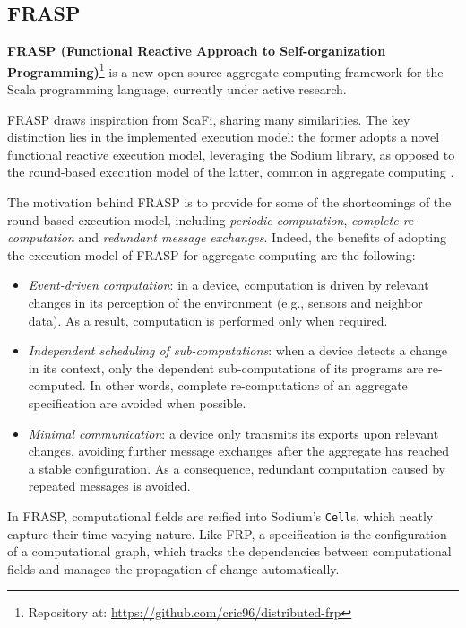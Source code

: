 
\subsection{FRASP}
\label{section:background:technologies:frasp}

\textbf{FRASP (Functional Reactive Approach to Self-organization Programming)}\footnote{Repository at: \url{https://github.com/cric96/distributed-frp}}
is a new open-source aggregate computing framework for the Scala programming
language, currently under active research.

FRASP draws inspiration from \ac{ScaFi}, sharing many similarities. The key
distinction lies in the implemented execution model: the former adopts a novel
functional reactive execution model, leveraging the Sodium library, as opposed
to the round-based execution model of the latter, common in aggregate computing
\cite{FRASP}.

The motivation behind FRASP is to provide for some of the shortcomings of the
round-based execution model, including \textit{periodic computation},
\textit{complete re-computation} and \textit{redundant message exchanges}.
Indeed, the benefits of adopting the execution model of FRASP for aggregate
computing are the following:
\begin{itemize}
  \item \textit{Event-driven computation}: in a device, computation is driven
        by relevant changes in its perception of the environment (e.g.,
        sensors and neighbor data). As a result, computation is performed
        only when required.
  \item \textit{Independent scheduling of sub-computations}: when a device
        detects a change in its context, only the dependent sub-computations
        of its programs are re-computed. In other words, complete
        re-computations of an aggregate specification are avoided when possible.
  \item \textit{Minimal communication}: a device only transmits its exports
        upon relevant changes, avoiding further message exchanges after the
        aggregate has reached a stable configuration. As a consequence, redundant
        computation caused by repeated messages is avoided.
\end{itemize}

In FRASP, computational fields are reified into Sodium's \texttt{Cell}s, which
neatly capture their time-varying nature. Like \ac{FRP}, a specification is the
configuration of a computational graph, which tracks the dependencies between
computational fields and manages the propagation of change automatically.

